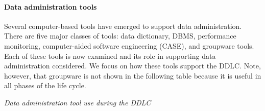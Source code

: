 \documentclass[
]{article}
\begin{document}
\hypertarget{data-administration-tools}{%
\paragraph*{Data administration tools}\label{data-administration-tools}}

Several computer-based tools have emerged to support data
administration. There are five major classes of tools: data dictionary,
DBMS, performance monitoring, computer-aided software engineering
(CASE), and groupware tools. Each of these tools is now examined and its
role in supporting data administration considered. We focus on how these
tools support the DDLC. Note, however, that groupware is not shown in
the following table because it is useful in all phases of the life
cycle.

\emph{Data administration tool use during the DDLC}
\end{document}
